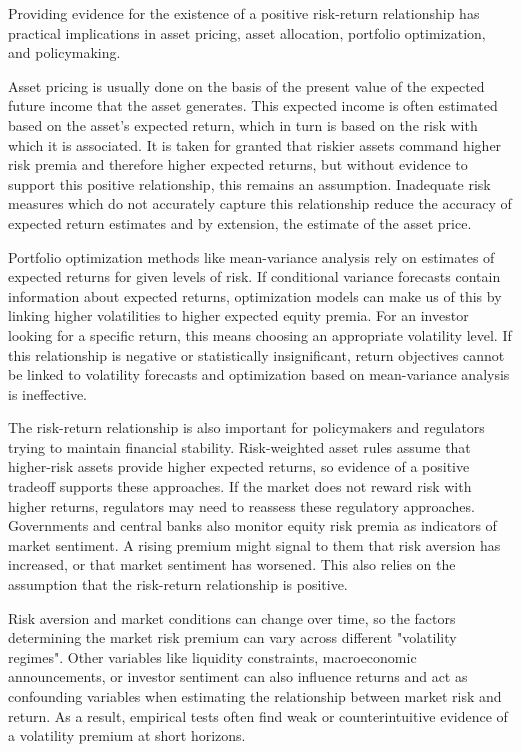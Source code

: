 \documentclass[12pt]{article}
\begin{document}
Providing evidence for the existence of a positive risk-return relationship has practical implications in asset pricing, asset allocation, portfolio optimization, and policymaking.\par
Asset pricing is usually done on the basis of the present value of the expected future income that the asset generates. This expected income is often estimated based on the asset's expected return, which in turn is based on the risk with which it is associated. It is taken for granted that riskier assets command higher risk premia and therefore higher expected returns, but without evidence to support this positive relationship, this remains an assumption. Inadequate risk measures which do not accurately capture this relationship reduce the accuracy of expected return estimates and by extension, the estimate of the asset price.\par
Portfolio optimization methods like mean-variance analysis rely on estimates of expected returns for given levels of risk. If conditional variance forecasts contain information about expected returns, optimization models can make us of this by linking higher volatilities to higher expected equity premia. For an investor looking for a specific return, this means choosing an appropriate volatility level. If this relationship is negative or statistically insignificant, return objectives cannot be linked to volatility forecasts and optimization based on mean-variance analysis is ineffective.\par
The risk-return relationship is also important for policymakers and regulators trying to maintain financial stability. Risk-weighted asset rules assume that higher-risk assets provide higher expected returns, so evidence of a positive tradeoff supports these approaches. If the market does not reward risk with higher returns, regulators may need to reassess these regulatory approaches. Governments and central banks also monitor equity risk premia as indicators of market sentiment. A rising premium might signal to them that risk aversion has increased, or that market sentiment has worsened. This also relies on the assumption that the risk-return relationship is positive.\par
Risk aversion and market conditions can change over time, so the factors determining the market risk premium can vary across different "volatility regimes". Other variables like liquidity constraints, macroeconomic announcements, or investor sentiment can also influence returns and act as confounding variables when estimating the relationship between market risk and return. As a result, empirical tests often find weak or counterintuitive evidence of a volatility premium at short horizons.\par
\end{document}
